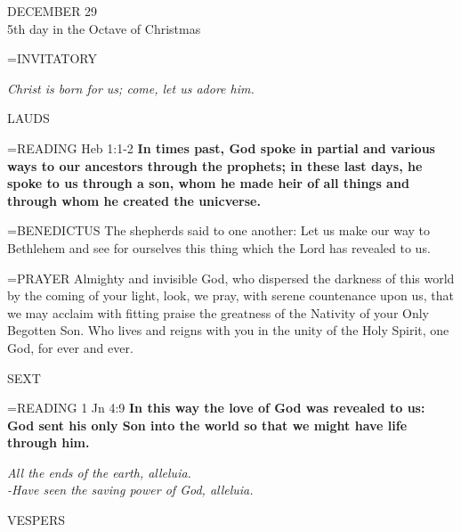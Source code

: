 \begin{center}\normalsize DECEMBER 29\\
\footnotesize 5th day in the Octave of Christmas\\
\end{center}

\hangindent=\parindent \small{INVITATORY}
\begin{center}
\textit{Christ is born for us; come, let us adore him.\\}
\end{center}

\begin{flushleft}\normalsize LAUDS\\\end{flushleft}

\hangindent=\parindent \small{READING}    Heb 1:1-2 \textbf{   In times past, God spoke in partial and various ways to our ancestors through the prophets; in these last days, he spoke to us through a son, whom he made heir of all things and through whom he created the unicverse.\\}

\hangindent=\parindent \small{BENEDICTUS      The shepherds said to one another: Let us make our way to Bethlehem and see for ourselves this thing which the Lord has revealed to us.\\}

\hangindent=\parindent \small{PRAYER  Almighty and invisible God, who dispersed the darkness of this world by the coming of your light, look, we pray, with serene countenance upon us, that we may acclaim with fitting praise the greatness of the Nativity of your Only Begotten Son. Who lives and reigns with you in the unity of the Holy Spirit, one God, for ever and ever.}

\begin{flushleft}\normalsize SEXT\\\end{flushleft}

\hangindent=\parindent \small{READING}    1 Jn 4:9 \textbf{    In this way the love of God was revealed to us: God sent his only Son into the world so that we might have life through him.}

\begin{center}
\textit{All the ends of the earth, alleluia.\\
-Have seen the saving power of God, alleluia.}
\end{center}

\begin{flushleft}\normalsize VESPERS\\\end{flushleft}

